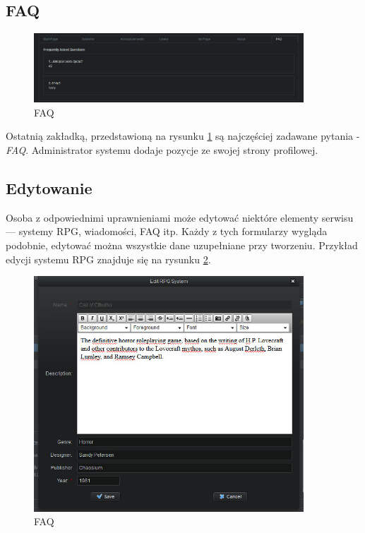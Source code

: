 \subsection{FAQ}
\label{sec:faq}

\begin{figure}[htb]	
\centering
\includegraphics[width=0.9\textwidth]{./img/interfejsy/faq}
\caption{FAQ}
\label{fig:faq}

\end{figure}
Ostatnią zakładką, przedstawioną na rysunku \ref{fig:faq} są najczęściej zadawane pytania - \emph{FAQ}. Administrator systemu dodaje pozycje ze swojej strony profilowej.

\subsection{Edytowanie}
\label{sec:edit}
Osoba z odpowiednimi uprawnieniami może edytować niektóre elementy serwisu --- systemy RPG, wiadomości, FAQ itp. Każdy z tych formularzy wygląda podobnie, edytować można wszystkie dane uzupełniane przy tworzeniu. Przykład edycji systemu RPG znajduje się na rysunku \ref{fig:edit}.

\begin{figure}[htb]	
\centering
\includegraphics[width=0.9\textwidth]{./img/interfejsy/edit}
\caption{FAQ}
\label{fig:edit}
\end{figure}

